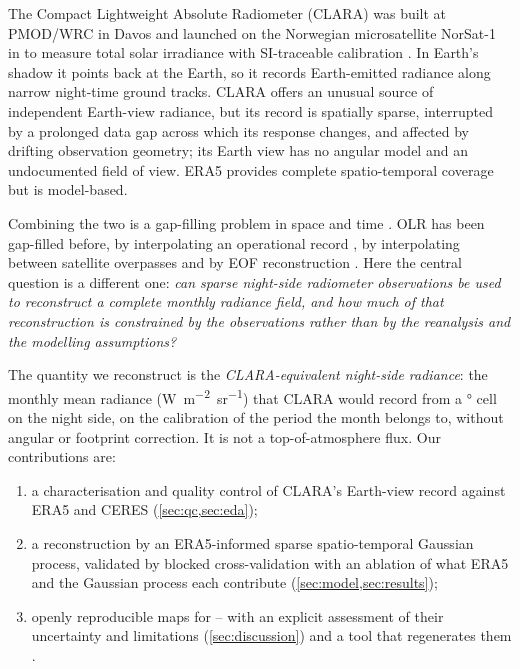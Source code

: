 \documentclass[10pt,twocolumn,a4paper]{article}
\newcommand{\Wmsr}{\si{W.m^{-2}.sr^{-1}}}   %
\begin{document}
The Compact Lightweight Absolute Radiometer (CLARA) was built at PMOD/WRC in Davos and launched on the Norwegian microsatellite NorSat-1 in \claraLaunch{} to measure total solar irradiance with SI-traceable calibration \cite{walter2017clara}. In Earth's shadow it points back at the Earth, so it records Earth-emitted radiance along narrow night-time ground tracks. CLARA offers an unusual source of independent Earth-view radiance, but its record is spatially sparse, interrupted by a prolonged data gap across which its response changes, and affected by drifting observation geometry; its Earth view has no angular model and an undocumented field of view. ERA5 \cite{hersbach2020era5} provides complete spatio-temporal coverage but is model-based.

Combining the two is a gap-filling problem in space and time \cite{cressie2011spatiotemporal}. OLR has been gap-filled before, by interpolating an operational record \cite{liebmann1996olr}, by interpolating between satellite overpasses \cite{doelling2013geo} and by EOF reconstruction \cite{beckers2003dineof}. Here the central question is a different one: \emph{can sparse night-side radiometer observations be used to reconstruct a complete monthly radiance field, and how much of that reconstruction is constrained by the observations rather than by the reanalysis and the modelling assumptions?}

The quantity we reconstruct is the \emph{CLARA-equivalent night-side radiance}: the monthly mean radiance (\Wmsr) that CLARA would record from a \gridRes° cell on the night side, on the calibration of the period the month belongs to, without angular or footprint correction. It is not a top-of-atmosphere flux. Our contributions are:
\begin{enumerate}[label=(\arabic*)]
\item a characterisation and quality control of CLARA's Earth-view record against ERA5 and CERES (\cref{sec:qc,sec:eda});
\item a reconstruction by an ERA5-informed sparse spatio-temporal Gaussian process, validated by blocked cross-validation with an ablation of what ERA5 and the Gaussian process each contribute (\cref{sec:model,sec:results});
\item openly reproducible maps for \firstYear--\lastYear{} with an explicit assessment of their uncertainty and limitations (\cref{sec:discussion}) and a tool that regenerates them \cite{andreozzi2026tool}.
\end{enumerate}
\end{document}
